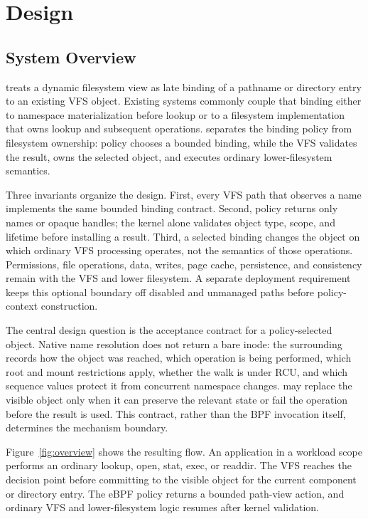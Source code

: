 \section{Design}
\label{sec:design}

\subsection{System Overview}

\namei treats a dynamic filesystem view as late binding of a pathname or
directory entry to an existing VFS object. Existing systems commonly couple
that binding either to namespace materialization before lookup or to a
filesystem implementation that owns lookup and subsequent operations. \namei
separates the binding policy from filesystem ownership: policy chooses a
bounded binding, while the VFS validates the result, owns the selected object,
and executes ordinary lower-filesystem semantics.

Three invariants organize the design. First, every VFS path that observes a
name implements the same bounded binding contract. Second, policy returns only
names or opaque handles; the kernel alone validates object type, scope, and
lifetime before installing a result. Third, a selected binding changes the
object on which ordinary VFS processing operates, not the semantics of those
operations. Permissions, file operations, data, writes, page cache,
persistence, and consistency remain with the VFS and lower filesystem. A
separate deployment requirement keeps this optional boundary off disabled and
unmanaged paths before policy-context construction.

The central design question is the acceptance contract for a policy-selected
object. Native name resolution does not return a bare inode: the surrounding
 records how the object was reached, which operation is being
performed, which root and mount restrictions apply, whether the walk is under
RCU, and which sequence values protect it from concurrent namespace changes.
\namei may replace the visible object only when it can preserve the relevant
state or fail the operation before the result is used. This contract, rather
than the BPF invocation itself, determines the mechanism boundary.

Figure~\ref{fig:overview} shows the resulting flow. An application in a
workload scope performs an ordinary lookup, open, stat, exec, or readdir. The
VFS reaches the \namei decision point before committing to the visible object
for the current component or directory entry. The eBPF policy returns a bounded
path-view action, and ordinary VFS and lower-filesystem logic resumes after
kernel validation.

